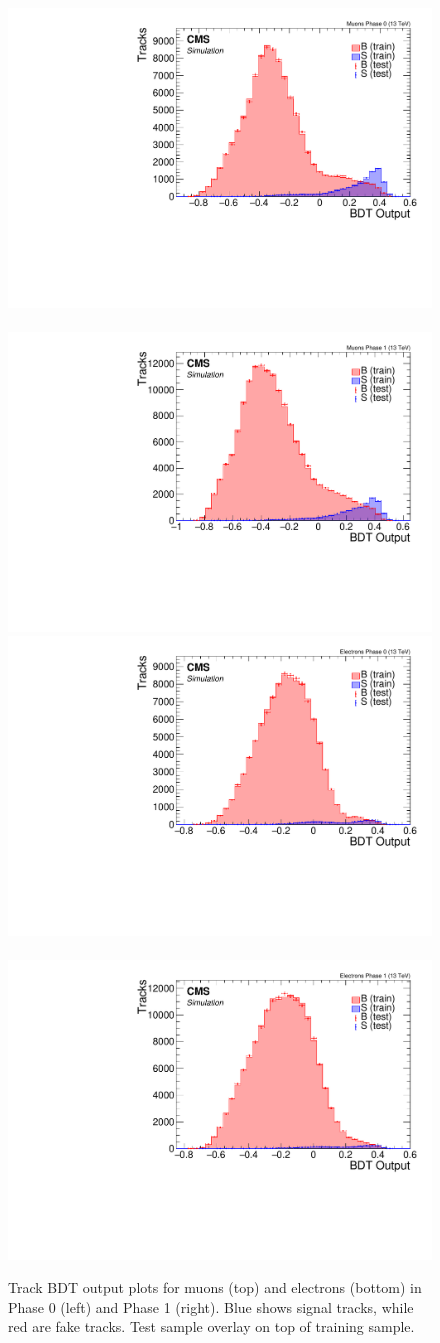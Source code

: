 \begin{figure}[!htb]
\centering
\includegraphics[width=0.48\linewidth]{plots/track_bdt/overtraining_Tracks_Muons_Phase_0.pdf} \,
\includegraphics[width=0.48\linewidth]{plots/track_bdt/overtraining_Tracks_Muons_Phase_1.pdf}  \\
\includegraphics[width=0.48\linewidth]{plots/track_bdt/overtraining_Tracks_Electrons_Phase_0.pdf} \,
\includegraphics[width=0.48\linewidth]{plots/track_bdt/overtraining_Tracks_Electrons_Phase_1.pdf} \\
\caption[Track BDT output plots]{Track BDT output plots for muons (top) and electrons (bottom) in Phase 0 (left) and Phase 1 (right). Blue shows signal tracks, while red are fake tracks. Test sample overlay on top of training sample.}
\label{fig:track-bdt-output}
\end{figure}

